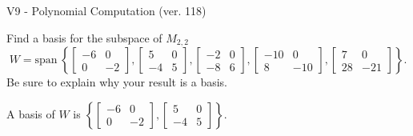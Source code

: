 \begin{exercise}
  \begin{exerciseTitle}V9 - Polynomial Computation (ver. 118)\end{exerciseTitle}
  \begin{exerciseStatement}
    Find a basis for the subspace of \(M_{2,2}\) 
\[W=\mathrm{span}\ \left\{\left[\begin{array}{cc}
-6 & 0 \\
0 & -2
\end{array}\right] , \left[\begin{array}{cc}
5 & 0 \\
-4 & 5
\end{array}\right] , \left[\begin{array}{cc}
-2 & 0 \\
-8 & 6
\end{array}\right] , \left[\begin{array}{cc}
-10 & 0 \\
8 & -10
\end{array}\right] , \left[\begin{array}{cc}
7 & 0 \\
28 & -21
\end{array}\right]\right\}.\]
 Be sure to explain why your result is a basis.


  \end{exerciseStatement}
  \begin{exerciseAnswer}
   A basis of \(W\) is  \(\left\{\left[\begin{array}{cc}
-6 & 0 \\
0 & -2
\end{array}\right] , \left[\begin{array}{cc}
5 & 0 \\
-4 & 5
\end{array}\right]\right\}\).
  


  \end{exerciseAnswer}
\end{exercise}